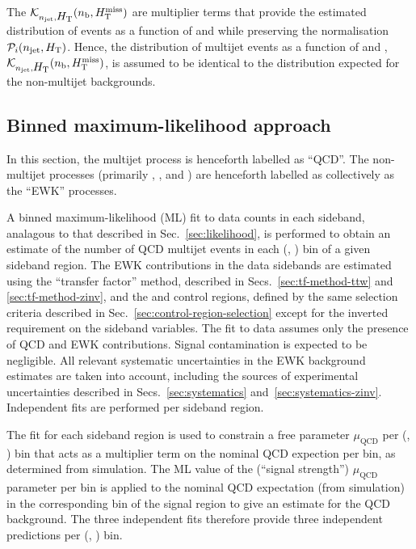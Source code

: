 The $\mathcal{K}_{n_{\text{jet}}, \mbox{$H_\text{T}$}}( n_{\text{b}}, \mbox{$H_{\rm T}^{\rm miss}$} )$ are multiplier
terms that provide the estimated distribution of events as a function
of \nb and \HTmiss while preserving the normalisation $\mathcal{P}_i(
n_{\text{jet}}, \mbox{$H_\text{T}$} )$. Hence, the distribution of multijet events as a
function of \nb and \HTmiss, $\mathcal{K}_{n_{\text{jet}}, \mbox{$H_\text{T}$}}( n_{\text{b}},
\mbox{$H_{\rm T}^{\rm miss}$} )$, is assumed to be identical to the distribution expected
for the non-multijet backgrounds.

\subsection{Binned maximum-likelihood approach}

In this section, the multijet process is henceforth labelled as
``QCD''. The non-multijet processes (primarily \wj, \ttbar, and
\znunu) are henceforth labelled as collectively as the ``EWK''
processes.

A binned maximum-likelihood (ML) fit to data counts in each sideband,
analagous to that described in Sec.~\ref{sec:likelihood}, is performed
to obtain an estimate of the number of QCD multijet events in each
(\njet, \scalht) bin of a given sideband region. The EWK contributions
in the data sidebands are estimated using the ``transfer factor''
method, described in Secs.~\ref{sec:tf-method-ttw} and
\ref{sec:tf-method-zinv}, and the \mj and \mmj control regions,
defined by the same selection criteria described in
Sec.~\ref{sec:control-region-selection} except for the inverted
requirement on the sideband variables. The fit to data assumes only
the presence of QCD and EWK contributions. Signal contamination is
expected to be negligible. All relevant systematic uncertainties in
the EWK background estimates are taken into account, including the
sources of experimental uncertainties described in
Secs.~\ref{sec:systematics}
and~\ref{sec:systematics-zinv}. Independent fits are performed per
sideband region.

The fit for each sideband region is used to constrain a free parameter
$\mu_{\textrm{QCD}}$ per (\njet, \scalht) bin that acts as a
multiplier term on the nominal QCD expection per bin, as determined
from simulation. The ML value of the (``signal strength'')
$\mu_{\textrm{QCD}}$ parameter per bin is applied to the nominal QCD
expectation (from simulation) in the corresponding bin of the signal
region to give an estimate for the QCD background. The three
independent fits therefore provide three independent predictions per
(\njet, \scalht) bin.

